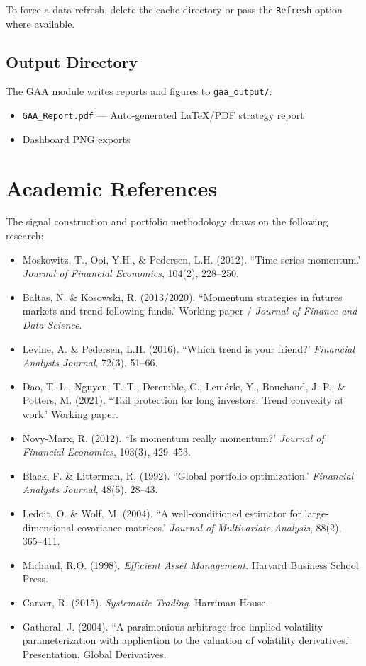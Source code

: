\documentclass[11pt,a4paper]{article}
\begin{document}
To force a data refresh, delete the cache directory or pass the \texttt{Refresh} option where available.

\subsection{Output Directory}
The GAA module writes reports and figures to \texttt{gaa\_output/}:
\begin{itemize}[leftmargin=2em]
  \item \texttt{GAA\_Report.pdf} --- Auto-generated \LaTeX/PDF strategy report
  \item Dashboard PNG exports
\end{itemize}
\newpage
\section{Academic References}

The signal construction and portfolio methodology draws on the following research:
\begin{itemize}[leftmargin=2em]
  \item Moskowitz, T., Ooi, Y.H., \& Pedersen, L.H. (2012). ``Time series momentum.' \textit{Journal of Financial Economics}, 104(2), 228--250.
  \item Baltas, N. \& Kosowski, R. (2013/2020). ``Momentum strategies in futures markets and trend-following funds.' Working paper / \textit{Journal of Finance and Data Science}.
  \item Levine, A. \& Pedersen, L.H. (2016). ``Which trend is your friend?' \textit{Financial Analysts Journal}, 72(3), 51--66.
  \item Dao, T.-L., Nguyen, T.-T., Deremble, C., Lem\'erle, Y., Bouchaud, J.-P., \& Potters, M. (2021). ``Tail protection for long investors: Trend convexity at work.' Working paper.
  \item Novy-Marx, R. (2012). ``Is momentum really momentum?' \textit{Journal of Financial Economics}, 103(3), 429--453.
  \item Black, F. \& Litterman, R. (1992). ``Global portfolio optimization.' \textit{Financial Analysts Journal}, 48(5), 28--43.
  \item Ledoit, O. \& Wolf, M. (2004). ``A well-conditioned estimator for large-dimensional covariance matrices.' \textit{Journal of Multivariate Analysis}, 88(2), 365--411.
  \item Michaud, R.O. (1998). \textit{Efficient Asset Management}. Harvard Business School Press.
  \item Carver, R. (2015). \textit{Systematic Trading}. Harriman House.
  \item Gatheral, J. (2004). ``A parsimonious arbitrage-free implied volatility parameterization with application to the valuation of volatility derivatives.' Presentation, Global Derivatives.
\end{itemize}
\end{document}
